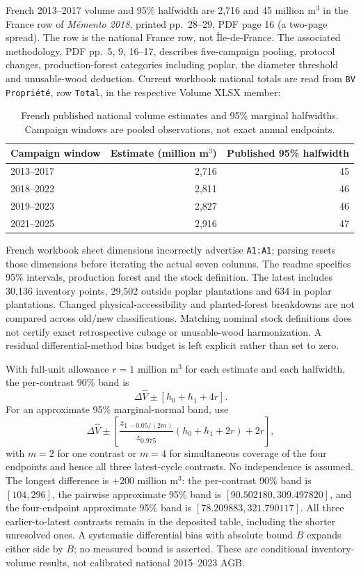 French 2013--2017 volume and 95\% halfwidth are 2,716 and 45 million m$^3$ in the France row of \emph{M\'emento 2018}, printed pp.~28--29, PDF page 16 (a two-page spread). The row is the national France row, not \^Ile-de-France. The associated methodology, PDF pp.~5, 9, 16--17, describes five-campaign pooling, protocol changes, production-forest categories including poplar, the diameter threshold and unusable-wood deduction. Current workbook national totals are read from \texttt{BV Propri\'et\'e}, row \texttt{Total}, in the respective Volume XLSX member:
\begin{table}[htbp]\centering\small
\caption{French published national volume estimates and 95\% marginal halfwidths. Campaign windows are pooled observations, not exact annual endpoints.}\label{tab:SI_France_windows}
\begin{tabular}{lrr}\toprule
Campaign window & Estimate (million m$^3$) & Published 95\% halfwidth\\\midrule
2013--2017 & 2,716 & 45\\
2018--2022 & 2,811 & 46\\
2019--2023 & 2,827 & 46\\
2021--2025 & 2,916 & 47\\\bottomrule
\end{tabular}\end{table}

French workbook sheet dimensions incorrectly advertise \texttt{A1:A1}; parsing resets those dimensions before iterating the actual seven columns. The readme specifies 95\% intervals, production forest and the stock definition. The latest includes 30,136 inventory points, 29,502 outside poplar plantations and 634 in poplar plantations. Changed physical-accessibility and planted-forest breakdowns are not compared across old/new classifications. Matching nominal stock definitions does not certify exact retrospective cubage or unusable-wood harmonization. A residual differential-method bias budget is left explicit rather than set to zero.

With full-unit allowance $r=1$ million m$^3$ for each estimate and each halfwidth, the per-contrast 90\% band is
\[
\Delta\widehat V\pm[h_0+h_1+4r].
\]
For an approximate 95\% marginal-normal band, use
\[
\Delta\widehat V\pm\left[\frac{z_{1-0.05/(2m)}}{z_{0.975}}(h_0+h_1+2r)+2r\right],
\]
with $m=2$ for one contrast or $m=4$ for simultaneous coverage of the four endpoints and hence all three latest-cycle contrasts. No independence is assumed. The longest difference is $+200$ million m$^3$: the per-contrast 90\% band is $[104,296]$, the pairwise approximate 95\% band is $[90.502180,309.497820]$, and the four-endpoint approximate 95\% band is $[78.209883,321.790117]$. All three earlier-to-latest contrasts remain in the deposited table, including the shorter unresolved ones. A systematic differential bias with absolute bound $B$ expands either side by $B$; no measured bound is asserted. These are conditional inventory-volume results, not calibrated national 2015--2023 AGB.

